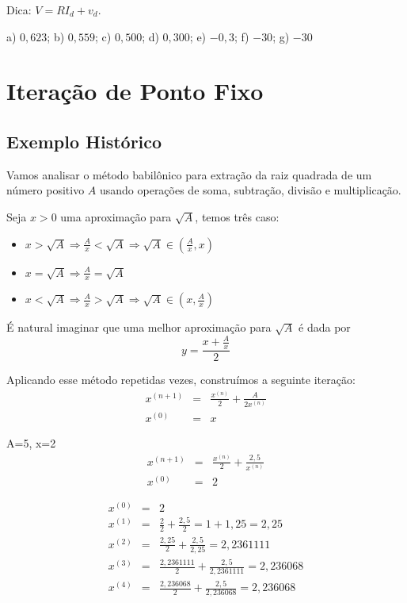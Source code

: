 \documentclass[main.tex]{subfiles}
\begin{document}
Dica: $V=RI_d+v_d$.
\begin{Answer}
  \begin{tiny}
    a) $0,623$; b) $0,559$; c) $0,500$; d) $0,300$; e) $-0,3$; f) $-30$; g) $-30$
  \end{tiny}
\end{Answer}


\section{Iteração de Ponto Fixo}

\subsection{Exemplo Histórico}
Vamos analisar o método babilônico para extração da raiz quadrada de um número positivo $A$ usando operações de soma, subtração, divisão e multiplicação.

Seja $x>0$ uma aproximação para $\sqrt{A}$, temos três caso:
\begin{itemize}
\item $x>\sqrt{A} \Longrightarrow \frac{A}{x}<\sqrt{A} \Longrightarrow \sqrt{A}\in \left(\frac{A}{x},x\right)$
\item $x=\sqrt{A} \Longrightarrow \frac{A}{x}=\sqrt{A}$
\item $x<\sqrt{A} \Longrightarrow \frac{A}{x}>\sqrt{A} \Longrightarrow \sqrt{A}\in \left(x,\frac{A}{x}\right)$
\end{itemize}
É natural imaginar que uma melhor aproximação para $\sqrt{A}$ é dada por
$$y=\frac{x+\frac{A}{x}}{2}$$

Aplicando esse método repetidas vezes, construímos a seguinte iteração:
\begin{eqnarray*}
x^{(n+1)}&=&\frac{x^{(n)}}{2}+\frac{A}{2x^{(n)}}\\
x^{(0)}&=&x
\end{eqnarray*}

\begin{ex}
A=5, x=2
\begin{eqnarray*}
x^{(n+1)}&=&\frac{x^{(n)}}{2}+\frac{2,5}{x^{(n)}}\\
x^{(0)}&=&2
\end{eqnarray*}

\begin{eqnarray*}
x^{(0)}&=&2\\
x^{(1)}&=&\frac{2}{2}+\frac{2,5}{2}=1+1,25=2,25\\
x^{(2)}&=&\frac{2,25}{2}+\frac{2,5}{2,25}= 2,2361111  \\
x^{(3)}&=&\frac{2,2361111}{2}+\frac{2,5}{2,2361111}= 2,236068  \\
x^{(4)}&=&\frac{2,236068}{2}+\frac{2,5}{2,236068}= 2,236068
\end{eqnarray*}  
\end{ex}
\end{document}
